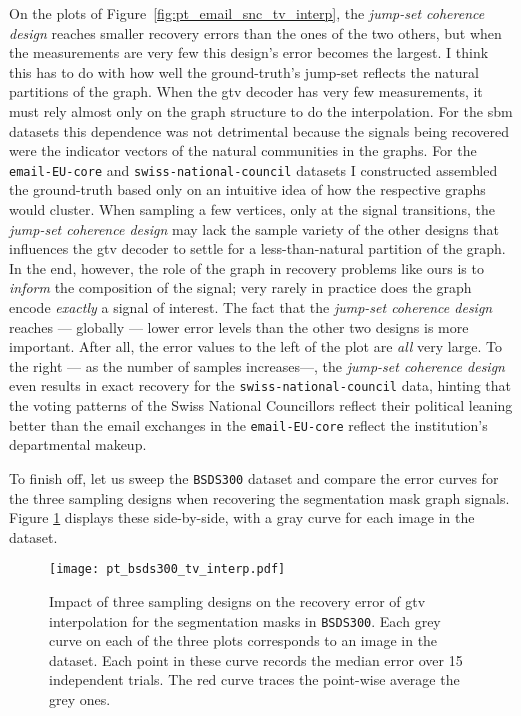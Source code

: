 On the plots of Figure~\ref{fig:pt_email_snc_tv_interp}, the \emph{jump-set coherence design} reaches smaller recovery errors than the ones of the two others, but when the measurements are very few this design's error becomes the largest. I think this has to do with how well the ground-truth's jump-set reflects the natural partitions of the graph. When the \acrshort{gtv} decoder has very few measurements, it must rely almost only on the graph structure to do the interpolation. For the \acrshort{sbm} datasets this dependence was not detrimental because the signals being recovered were the indicator vectors of the natural communities in the graphs. For the \texttt{email-EU-core} and \texttt{swiss-national-council} datasets I constructed assembled the ground-truth based only on an intuitive idea of how the respective graphs would cluster. When sampling a few vertices, only at the signal transitions, the \emph{jump-set coherence design} may lack the sample variety of the other designs that influences the \acrshort{gtv} decoder to settle for a less-than-natural partition of the graph. In the end, however, the role of the graph in recovery problems like ours is to \emph{inform} the composition of the signal; very rarely in practice does the graph encode \emph{exactly} a signal of interest. The fact that the \emph{jump-set coherence design} reaches --- globally --- lower error levels than the other two designs is more important. After all, the error values to the left of the plot are \emph{all} very large. To the right --- as the number of samples increases---, the \emph{jump-set coherence design} even results in exact recovery for the \texttt{swiss-national-council} data, hinting that the voting patterns of the Swiss National Councillors reflect their political leaning better than the email exchanges in the \texttt{email-EU-core} reflect the institution's departmental makeup.

To finish off, let us sweep the \texttt{BSDS300} dataset and compare the error curves for the three sampling designs when recovering the segmentation mask graph signals. Figure \ref{fig:pt_bsds300_tv_interp} displays these side-by-side, with a gray curve for each image in the dataset.

\begin{figure}[H]
    \centering
    \texttt{[image: pt\_bsds300\_tv\_interp.pdf]}
    \caption[Three sampling designs: \texttt{BSDS300}]{Impact of three sampling designs on the recovery error of \acrshort{gtv} interpolation for the segmentation masks in \texttt{BSDS300}. Each grey curve on each of the three plots corresponds to an image in the dataset. Each point in these curve records the median error over 15 independent trials. The red curve traces the point-wise average the grey ones.}
    \label{fig:pt_bsds300_tv_interp}
\end{figure}

